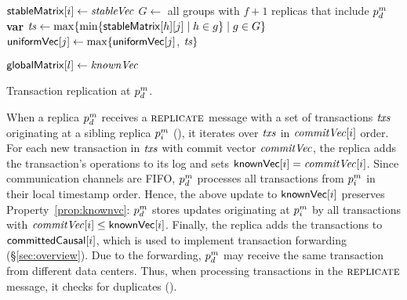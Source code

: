 \begin{algorithm}[t]
\begin{algorithmic}[1]
    \SpaceHandler
    \vspace{-1pt}

    \label{line:updateuniformvc}
      \State $\gmc[i] \gets \astablesnapshot$\label{line:updatestablematrix}
      \State $G\gets$ all groups with $f+1$ replicas that include $\partition^m_d$\label{line:enumerate}
        \State \textbf{var} $\ts \gets \max \{ \min \{ \gmc[\athirddc][j] \mid \athirddc \in g \} \mid g \in G\}$
        \State ${\sf uniformVec}[j] \gets \max \{ {\sf uniformVec}[j]$, $\ts\}$
      \EndFor
    \EndWhenRcv

    \SpaceHandler
    \vspace{-1pt}

    \WhenRcv[\UPDRCV($\areplica$, $\areplicavectorclock$)]\label{line:updateglobalmatrix}
      \State $\rvc[\areplica] \gets \areplicavectorclock$
    \EndWhenRcv
  \end{algorithmic}
  \caption{Transaction replication at $\partition^m_d$.}
  \label{alg:replication}
  \label{alg:clock}
\end{algorithm}









When a replica $\partition^m_d$ receives a $\textsc{replicate}$ message with a set of
transactions $\atxs$ originating at a sibling replica $\partition^m_i$
(), it iterates over $\atxs$ in
$\commitvector[i]$ order. For each new transaction in $\atxs$ with commit vector
$\commitvector$, the replica adds the transaction's operations to its log and
sets $\replicavectorclock[i]=\commitvector[i]$. Since communication channels are
FIFO, $\partition^m_d$ processes all transactions from $\partition^m_i$ in their
local timestamp order. Hence, the above update to ${\sf knownVec}[i]$
preserves Property~\ref{prop:knownvc}: $\partition^m_d$ stores updates
originating at $\partition^m_i$ by all transactions with
$\commitvector[i]\leq \replicavectorclock[i]$.  Finally, the replica adds the
transactions to ${\sf committedCausal}[i]$, which is used to implement transaction
forwarding (\S\ref{sec:overview}).  Due to the forwarding, $\partition^m_d$ may
receive the same transaction from different data centers. Thus, when processing
transactions in the $\textsc{replicate}$ message, it checks for duplicates
().









